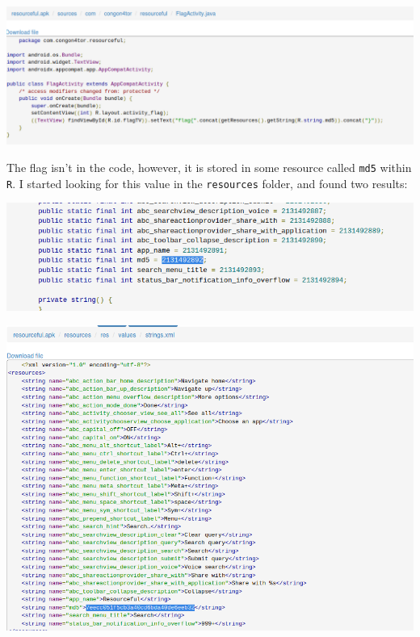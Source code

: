 \documentclass{article}
\begin{document}
\begin{center}
    \includegraphics[width=16cm]{resourceful/screenshot2.png}
\end{center}

\noindent
The flag isn't in the code, however, it is stored in some resource called \texttt{md5} within \texttt{R}. I started looking for this value in the \texttt{resources} folder, and found two results:

\begin{center}
    \includegraphics[width=16cm]{resourceful/screenshot3.png}
\end{center}

\begin{center}
    \includegraphics[width=16cm]{resourceful/screenshot4.png}
\end{center}
\end{document}
